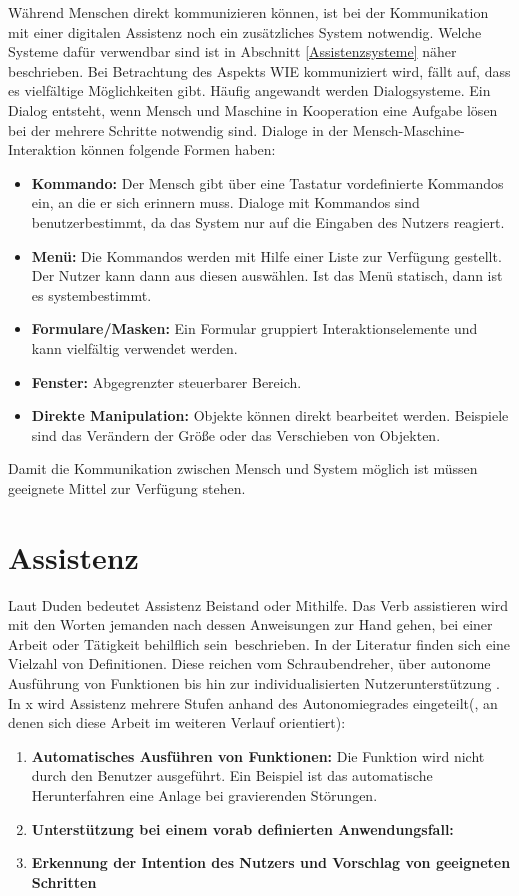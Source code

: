 Während Menschen direkt kommunizieren können, ist bei der Kommunikation mit einer digitalen Assistenz noch ein zusätzliches System notwendig. Welche Systeme dafür verwendbar sind ist in Abschnitt \ref{Assistenzsysteme} näher beschrieben. Bei Betrachtung des Aspekts WIE kommuniziert wird, fällt auf, dass es vielfältige Möglichkeiten gibt. Häufig angewandt werden Dialogsysteme. Ein Dialog entsteht, wenn Mensch und Maschine in Kooperation eine Aufgabe lösen bei der mehrere Schritte notwendig sind. Dialoge in der Mensch-Maschine-Interaktion können folgende Formen haben:
\begin{itemize}
\item \textbf{Kommando:} Der Mensch gibt über eine Tastatur vordefinierte Kommandos ein, an die er sich erinnern muss. Dialoge mit Kommandos sind benutzerbestimmt, da das System nur auf die Eingaben des Nutzers reagiert.
\item \textbf{Menü:} Die Kommandos werden mit Hilfe einer Liste zur Verfügung gestellt. Der Nutzer kann dann aus diesen auswählen. Ist das Menü statisch, dann ist es systembestimmt.
\item \textbf{Formulare/Masken:} Ein Formular gruppiert Interaktionselemente und kann vielfältig verwendet werden.
\item \textbf{Fenster:} Abgegrenzter steuerbarer Bereich.
\item \textbf{Direkte Manipulation:} Objekte können direkt bearbeitet werden. Beispiele sind das Verändern der Größe oder das Verschieben von Objekten.
\end{itemize}
Damit die Kommunikation zwischen Mensch und System möglich ist müssen geeignete Mittel zur Verfügung stehen.

\section{Assistenz}
Laut Duden bedeutet Assistenz Beistand oder Mithilfe. Das Verb assistieren wird mit den Worten \glqq jemanden nach dessen Anweisungen zur Hand gehen, bei einer Arbeit oder Tätigkeit behilflich sein\grqq \ beschrieben. In der Literatur finden sich eine Vielzahl von Definitionen. Diese reichen vom Schraubendreher, über autonome Ausführung von Funktionen bis hin zur individualisierten Nutzerunterstützung \cite{Ludwig}. In x wird Assistenz mehrere Stufen anhand des Autonomiegrades eingeteilt(, an denen sich diese Arbeit im weiteren Verlauf orientiert):
\begin{enumerate}
\item \textbf{Automatisches Ausführen von Funktionen:} Die Funktion wird nicht durch den Benutzer ausgeführt. Ein Beispiel ist das automatische Herunterfahren eine Anlage bei gravierenden Störungen.
\item \textbf{Unterstützung bei einem vorab definierten Anwendungsfall:}
\item \textbf{Erkennung der Intention des Nutzers und Vorschlag von geeigneten Schritten}
\end{enumerate}

